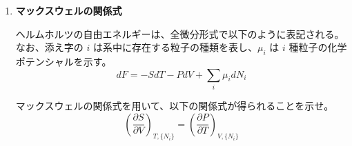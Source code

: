 \documentclass[uplatex,dvipdfmx,a4paper,11pt]{jsarticle}
\begin{document}
\begin{enumerate}

\item
{\bf マックスウェルの関係式}

ヘルムホルツの自由エネルギーは、全微分形式で以下のように表記される。
なお、添え字の $i$ は系中に存在する粒子の種類を表し、$\mu_i$ は $i$ 種粒子の化学ポテンシャルを示す。
\begin{equation*}
dF = -S dT -P dV + \sum_i \mu_i d N_i
\end{equation*}

マックスウェルの関係式を用いて、以下の関係式が得られることを示せ。
\begin{equation*}
\left(\dfrac{\partial S}{\partial V} \right)_{T, \{N_i\}} = \left(\dfrac{\partial P}{\partial T} \right)_{V, \{N_i\}}
\end{equation*}

%
%


\end{enumerate}
\end{document}
